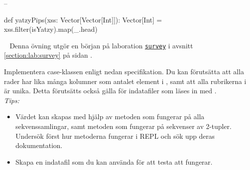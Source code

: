 \SubtaskSolved  --

\SubtaskSolved  \begin{Code}
def yatzyPips(xss: Vector[Vector[Int]]): Vector[Int] =
  xss.filter(isYatzy).map(_.head)
\end{Code}




\QUESTEND









\QUESTBEGIN

\Task  \what~  Denna övning utgör en början på laboration \hyperref[section:lab:survey]{\texttt{survey}} i avsnitt \ref{section:lab:survey} på sidan \pageref{section:lab:survey}.

\Subtask Implementera case-klassen  enligt nedan specifikation. Du kan förutsätta att alla rader har lika många kolumner som antalet element i , samt att alla rubrikerna i  är unika. Detta förutsätts också gälla för indatafiler som läses in med .
\\ \noindent \emph{Tips:}
\begin{itemize}[nolistsep,noitemsep]
\item Värdet  kan skapas med hjälp av metoden  som fungerar på alla sekvenssamlingar, samt metoden  som fungerar på sekvenser av 2-tupler. Undersök först hur metoderna fungerar i REPL och sök upp deras dokumentation.
\item Skapa en indatafil som du kan använda för att testa att  fungerar.
\end{itemize}

